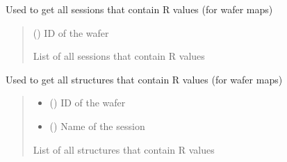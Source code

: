 \documentclass[letterpaper,10pt,english]{sphinxmanual}
\begin{document}

\begin{fulllineitems}
\label{\detokenize{getter:getter.get_R_sessions}}
\pysigstartsignatures
{}
\pysigstopsignatures
\sphinxAtStartPar
Used to get all sessions that contain R values (for wafer maps)
\begin{quote}\begin{description}
\sphinxAtStartPar
{} () \textendash{} ID of the wafer

\sphinxAtStartPar
List of all sessions that contain R values

\end{description}\end{quote}

\end{fulllineitems}


\begin{fulllineitems}
\label{\detokenize{getter:getter.get_R_structures}}
\pysigstartsignatures
{}
\pysigstopsignatures
\sphinxAtStartPar
Used to get all structures that contain R values (for wafer maps)
\begin{quote}\begin{description}
\begin{itemize}
\item {} 
\sphinxAtStartPar
{} () \textendash{} ID of the wafer

\item {} 
\sphinxAtStartPar
{} () \textendash{} Name of the session

\end{itemize}

\sphinxAtStartPar
List of all structures that contain R values

\end{description}\end{quote}

\end{fulllineitems}
\end{document}
